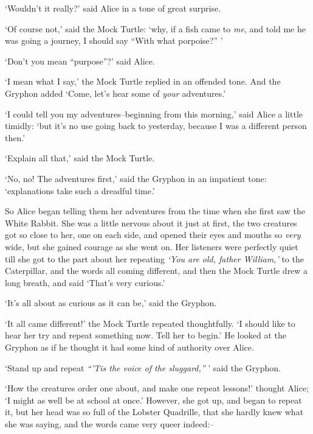   `Wouldn't it really?' said Alice in a tone of great surprise.

  `Of course not,' said the Mock Turtle:  `why, if a fish came
to {\it me}, and told me he was going a journey, I should say ``With
what porpoise?'' '

  `Don't you mean ``purpose''?' said Alice.

  `I mean what I say,' the Mock Turtle replied in an offended
tone.  And the Gryphon added `Come, let's hear some of {\it your}
adventures.'

  `I could tell you my adventures--beginning from this morning,'
said Alice a little timidly:  `but it's no use going back to
yesterday, because I was a different person then.'

  `Explain all that,' said the Mock Turtle.

  `No, no!  The adventures first,' said the Gryphon in an
impatient tone:  `explanations take such a dreadful time.'

  So Alice began telling them her adventures from the time when
she first saw the White Rabbit.  She was a little nervous about
it just at first, the two creatures got so close to her, one on
each side, and opened their eyes and mouths so {\it very} wide, but she
gained courage as she went on.  Her listeners were perfectly
quiet till she got to the part about her repeating {\it `You are old,
father William,'} to the Caterpillar, and the words all coming
different, and then the Mock Turtle drew a long breath, and said
`That's very curious.'

  `It's all about as curious as it can be,' said the Gryphon.

  `It all came different!' the Mock Turtle repeated
thoughtfully.  `I should like to hear her try and repeat
something now.  Tell her to begin.'  He looked at the Gryphon as
if he thought it had some kind of authority over Alice.

  `Stand up and repeat {\it ``'Tis the voice of the sluggard,''} ' said
the Gryphon.

  `How the creatures order one about, and make one repeat
lessons!' thought Alice; `I might as well be at school at once.'
However, she got up, and began to repeat it, but her head was so
full of the Lobster Quadrille, that she hardly knew what she was
saying, and the words came very queer indeed:--
\onelineskip
{}
\onelineskip
\startline{0.6}{    [later editions continued as follows:}
\startline{0.6}{    His voice has a timid and tremulous sound.]}
\onelineskip

